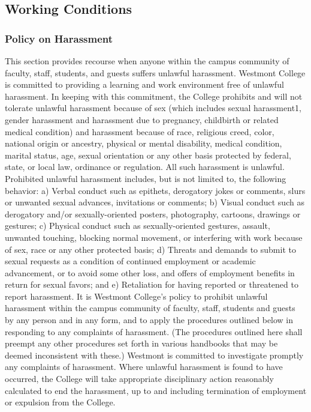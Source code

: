 \documentclass[letterpaper, 11pt]{article}
\begin{document}
	\subsection{Working Conditions}
		\subsubsection{Policy on Harassment}
			This section provides recourse when anyone within the campus community of faculty, staff, students, and guests suffers unlawful harassment.
			Westmont College is committed to providing a learning and work environment free of unlawful harassment.  In keeping with this commitment, the College prohibits and will not tolerate unlawful harassment because of sex (which includes sexual harassment1, gender harassment and harassment due to pregnancy, childbirth or related medical condition) and harassment because of race, religious creed, color, national origin or ancestry, physical or mental disability, medical condition, marital status, age, sexual orientation or any other basis protected by federal, state, or local law, ordinance or regulation.  All such harassment is unlawful.
			Prohibited unlawful harassment includes, but is not limited to, the following behavior:
			a) Verbal conduct such as epithets, derogatory jokes or comments, slurs or unwanted sexual advances, invitations or comments;
			b) Visual conduct such as derogatory and/or sexually-oriented posters, photography, cartoons, drawings or gestures;
			c) Physical conduct such as sexually-oriented gestures, assault, unwanted touching, blocking normal movement, or interfering with work because of sex, race or any other protected basis;
			d) Threats and demands to submit to sexual requests as a condition of continued employment or academic advancement, or to avoid some other loss, and offers of employment benefits in return for sexual favors; and
			e) Retaliation for having reported or threatened to report harassment.
			It is Westmont College's policy to prohibit unlawful harassment within the campus community of faculty, staff, students and guests by any person and in any form, and to apply the procedures outlined below in responding to any complaints of harassment.  (The procedures outlined here shall preempt any other procedures set forth in various handbooks that may be deemed inconsistent with these.)  Westmont is committed to investigate promptly any complaints of harassment.  Where unlawful harassment is found to have occurred, the College will take appropriate disciplinary action reasonably calculated to end the harassment, up to and including termination of employment or expulsion from the College.
\end{document}
